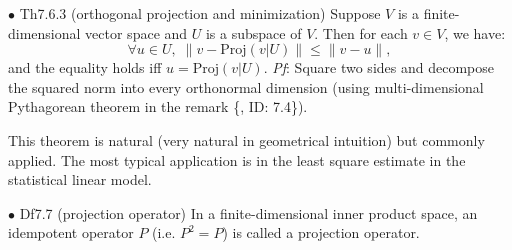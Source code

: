 \documentclass{article}
\begin{document}
\begin{Th}{$\bullet$ Th7.6.3 (orthogonal projection and minimization)}
    Suppose $V$ is a finite-dimensional vector space and $U$ is a subspace of $V$. Then for each $v\in V$, we have:
    $$\forall u\in U, \; \|v-\text{Proj}(v|U)\|\leq \|v-u\|,$$
    and the equality holds iff $u=\text{Proj}(v|U)$. 
    \tcblower
    \textit{Pf}: Square two sides and decompose the squared norm into every orthonormal dimension (using multi-dimensional Pythagorean theorem in the remark \{, ID: 7.4\}).
\end{Th}

\begin{Rmk}{}
    This theorem is natural (very natural in geometrical intuition) but commonly applied. The most typical application is in the least square estimate in the statistical linear model.
\end{Rmk}

\begin{Df}{$\bullet$ Df7.7 (projection operator)}
    In a finite-dimensional inner product space, an idempotent operator $P$ (i.e. $P^2 = P$) is called a projection operator.
\end{Df}
\end{document}

